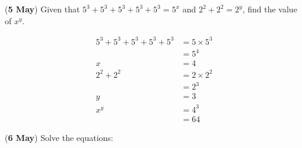 \documentclass[12pt, answers]{exam}
\begin{document}
\begin{questions}
	\question (\textbf{5 May}) Given that \(5^3 + 5^3 + 5^3 + 5^3 + 5^3 = 5^x\) and
	\(2^2 + 2^2 = 2^y\), find the value of \(x^y\).
	\begin{solution}
		\begin{align*}
			5^3 + 5^3 + 5^3 + 5^3 + 5^3 & = 5 \times 5^3               \\
			                            & = 5^4                        \\
			x                           & = 4 \label{eq:05051} \tag{1} \\
			2^2 + 2^2                   & = 2 \times 2^2               \\
			                            & = 2^3                        \\
			y                           & = 3 \label{eq:05052} \tag{2} \\
			x^y                         & = 4^3                        \\
			                            & = 64
		\end{align*}
	\end{solution}

	\question (\textbf{6 May}) Solve the equations:
\end{questions}
\end{document}
